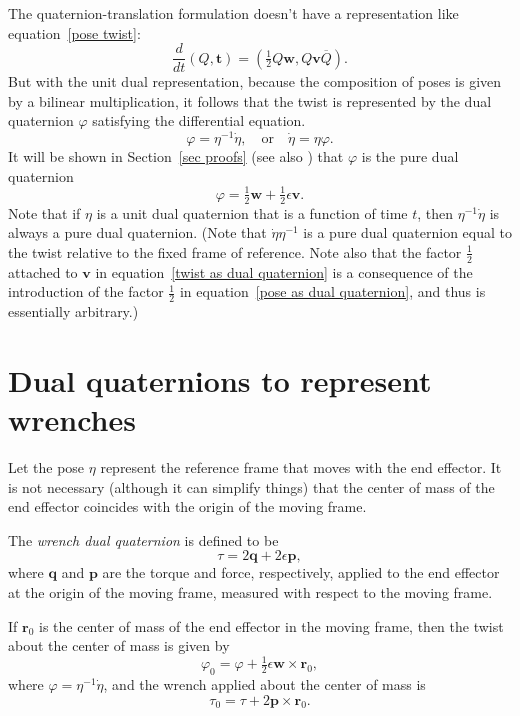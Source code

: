 \documentclass[reqno,12pt]{amsart}
\begin{document}
The quaternion-translation formulation doesn't have a representation like equation~\eqref{pose twist}:
\begin{equation}
\frac d{dt} (Q, \bm t) = \left(\tfrac12 Q \bm w, Q \bm v \overline Q \right).
\end{equation}
But with the unit dual representation, because the composition of poses is given by a bilinear multiplication, it follows that the twist is represented by the dual quaternion $\varphi$ satisfying the differential equation.
\begin{equation}
\label{ode dual quaternion}
\varphi = \eta^{-1} \dot \eta, \quad\text{or}\quad\dot \eta = \eta \varphi .
\end{equation}
It will be shown in Section~\ref{sec proofs} (see also \cite{han-et-al,wang-et-al}) that $\varphi$ is the pure dual quaternion
\begin{equation}
\label{twist as dual quaternion}
\varphi = \tfrac12 \bm w + \tfrac12 \epsilon \bm v .
\end{equation}
Note that if $\eta$ is a unit dual quaternion that is a function of time $t$, then $\eta^{-1} \dot \eta$ is always a pure dual quaternion.  (Note that $\dot\eta\eta^{-1}$ is a pure dual quaternion equal to the twist relative to the fixed frame of reference.  Note also that the factor $\tfrac12$ attached to $\bm v$ in equation~\eqref{twist as dual quaternion} is a consequence of the introduction of the factor $\tfrac12$ in equation~\eqref{pose as dual quaternion}, and thus is essentially arbitrary.)

\section{Dual quaternions to represent wrenches}

Let the pose $\eta$ represent the reference frame that moves with the end effector.  It is not necessary (although it can simplify things) that the center of mass of the end effector coincides with the origin of the moving frame.

The \emph{wrench dual quaternion} is defined to be
\begin{equation}
\label{wrench as quaternion}
\tau = 2 \bm q + 2 \epsilon \bm p,
\end{equation}
where $\bm q$ and $\bm p$ are the torque and force, respectively, applied to the end effector at the origin of the moving frame, measured with respect to the moving frame.

If $\bm r_0$ is the center of mass of the end effector in the moving frame, then the twist about the center of mass is given by
\begin{equation}
\label{twist correction}
\varphi_0 = 
\varphi + \tfrac12\epsilon\bm w \times \bm r_0,
\end{equation}
where $\varphi = \eta^{-1} \dot \eta$, and the wrench applied about the center of mass is
\begin{equation}
\label{torque correction}
\tau_0 = 
\tau + 2 \bm p \times \bm r_0.
\end{equation}
\end{document}
